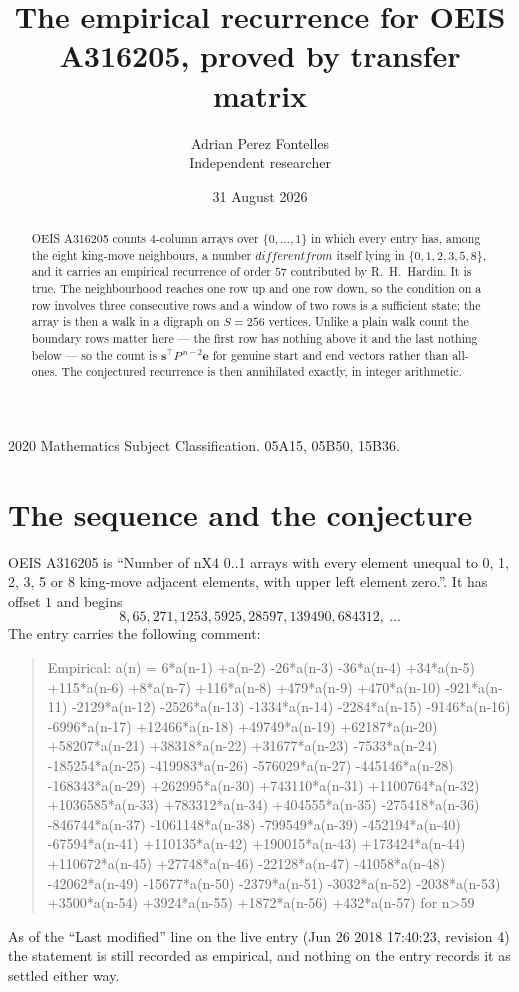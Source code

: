 \documentclass[11pt,a4paper]{article}
\title{The empirical recurrence for OEIS A316205, proved by transfer matrix}
\author{Adrian Perez Fontelles\\ \small Independent researcher}
\date{31 August 2026}
\theoremstyle{plain}
\theoremstyle{definition}
\begin{document}
\maketitle

\begin{abstract}
OEIS A316205 counts $4$-column arrays over $\{0,\dots,1\}$ in which every entry has,
among the eight king-move neighbours, a number $different from$ itself lying in $\{0,1,2,3,5,8\}$, and it carries an empirical
recurrence of order $57$ contributed by R.~H.~Hardin. It is true. The neighbourhood
reaches one row up and one row down, so the condition on a row involves three consecutive
rows and a window of two rows is a sufficient state; the array is then a walk in a digraph
on $S=256$ vertices. Unlike a plain walk count the boundary rows matter here --- the first
row has nothing above it and the last nothing below --- so the count is
$\mathbf{s}^{\!\top}P^{\,n-2}\mathbf{e}$ for genuine start and end vectors rather than
all-ones. The conjectured recurrence is then annihilated exactly, in integer arithmetic.
\end{abstract}

\noindent\small 2020 Mathematics Subject Classification. 05A15, 05B50, 15B36.\normalsize

\section{The sequence and the conjecture}

OEIS A316205 is ``Number of nX4 0..1 arrays with every element unequal to 0, 1, 2, 3, 5 or 8 king-move adjacent elements, with upper left element zero.''. It has offset
$1$ and begins
\[
8, 65, 271, 1253, 5925, 28597, 139490, 684312,\ \dots
\]
The entry carries the following comment:
\begin{quote}\small
Empirical: a(n) = 6*a(n-1) +a(n-2) -26*a(n-3) -36*a(n-4) +34*a(n-5) +115*a(n-6) +8*a(n-7) +116*a(n-8) +479*a(n-9) +470*a(n-10) -921*a(n-11) -2129*a(n-12) -2526*a(n-13) -1334*a(n-14) -2284*a(n-15) -9146*a(n-16) -6996*a(n-17) +12466*a(n-18) +49749*a(n-19) +62187*a(n-20) +58207*a(n-21) +38318*a(n-22) +31677*a(n-23) -7533*a(n-24) -185254*a(n-25) -419983*a(n-26) -576029*a(n-27) -445146*a(n-28) -168343*a(n-29) +262995*a(n-30) +743110*a(n-31) +1100764*a(n-32) +1036585*a(n-33) +783312*a(n-34) +404555*a(n-35) -275418*a(n-36) -846744*a(n-37) -1061148*a(n-38) -799549*a(n-39) -452194*a(n-40) -67594*a(n-41) +110135*a(n-42) +190015*a(n-43) +173424*a(n-44) +110672*a(n-45) +27748*a(n-46) -22128*a(n-47) -41058*a(n-48) -42062*a(n-49) -15677*a(n-50) -2379*a(n-51) -3032*a(n-52) -2038*a(n-53) +3500*a(n-54) +3924*a(n-55) +1872*a(n-56) +432*a(n-57) for n>59
\end{quote}
As of the ``Last modified'' line on the live entry (Jun 26 2018 17:40:23, revision
4) the statement is still recorded as empirical, and nothing on the entry
records it as settled either way.
\end{document}
